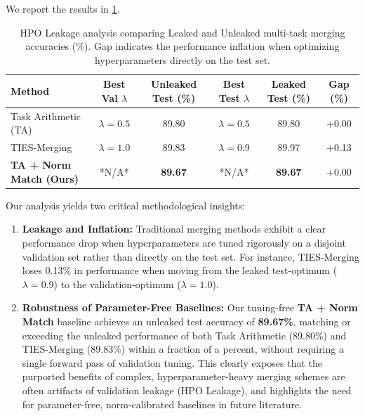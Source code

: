 \documentclass{article}
\begin{document}
We report the results in \cref{tab:hpo_leakage_results}.

\begin{table}[h]
\caption{HPO Leakage analysis comparing Leaked and Unleaked multi-task merging accuracies (\%). Gap indicates the performance inflation when optimizing hyperparameters directly on the test set.}
\label{tab:hpo_leakage_results}
\vskip 0.15in
\begin{center}
\begin{small}
\begin{sc}
\begin{tabular}{lccccc}
\toprule
Method & Best Val $\lambda$ & Unleaked Test (\%) & Best Test $\lambda$ & Leaked Test (\%) & Gap (\%) \\
\midrule
Task Arithmetic (TA) & $\lambda = 0.5$ & 89.80 & $\lambda = 0.5$ & 89.80 & +0.00 \\
TIES-Merging & $\lambda = 1.0$ & 89.83 & $\lambda = 0.9$ & 89.97 & +0.13 \\
\textbf{TA + Norm Match (Ours)} & *N/A* & \textbf{89.67} & *N/A* & \textbf{89.67} & +0.00 \\
\bottomrule
\end{tabular}
\end{sc}
\end{small}
\end{center}
\vskip -0.1in
\end{table}

Our analysis yields two critical methodological insights:
\begin{enumerate}
    \item \textbf{Leakage and Inflation:} Traditional merging methods exhibit a clear performance drop when hyperparameters are tuned rigorously on a disjoint validation set rather than directly on the test set. For instance, TIES-Merging loses 0.13\% in performance when moving from the leaked test-optimum ($\lambda = 0.9$) to the validation-optimum ($\lambda = 1.0$).
    \item \textbf{Robustness of Parameter-Free Baselines:} Our tuning-free \textbf{TA + Norm Match} baseline achieves an unleaked test accuracy of \textbf{89.67\%}, matching or exceeding the unleaked performance of both Task Arithmetic (89.80\%) and TIES-Merging (89.83\%) within a fraction of a percent, without requiring a single forward pass of validation tuning. This clearly exposes that the purported benefits of complex, hyperparameter-heavy merging schemes are often artifacts of validation leakage (HPO Leakage), and highlights the need for parameter-free, norm-calibrated baselines in future literature.
\end{enumerate}
\end{document}
